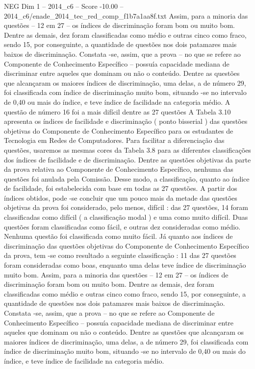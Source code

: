 \begin{textsample}{NEG Dim 1 – 2014\_c6 – Score -10.00 – 2014\_c6/enade\_2014\_tec\_red\_comp\_f1b7a1aa8f.txt}
Assim, para a minoria das questões – 12 em 27 – os índices de discriminação foram bom ou muito bom.
Dentre as demais, dez foram classificadas como médio e outras cinco como fraco, sendo 15, por conseguinte, a quantidade de questões nos dois patamares mais baixos de discriminação.
Constata -se, assim, que a prova – no que se refere ao Componente de Conhecimento Específico – possuía capacidade mediana de discriminar entre aqueles que dominam ou não o conteúdo.
Dentre as questões que alcançaram os maiores índices de discriminação, uma delas, a de número 29, foi classificada com índice de discriminação muito bom, situando -se no intervalo de 0,40 ou mais do índice, e teve índice de facilidade na categoria médio.
A questão de número 16 foi a mais difícil dentre as 27 questões A Tabela 3.10 apresenta os índices de facilidade e discriminação ( ponto bisserial ) das questões objetivas do Componente de Conhecimento Específico para os estudantes de Tecnologia em Redes de Computadores.
Para facilitar a diferenciação das questões, usaremos as mesmas cores da Tabela 3.8 para as diferentes classificações dos índices de facilidade e de discriminação.
Dentre as questões objetivas da parte da prova relativa ao Componente de Conhecimento Específico, nenhuma das questões foi anulada pela Comissão.
Desse modo, a classificação, quanto ao índice de facilidade, foi estabelecida com base em todas as 27 questões.
A partir dos índices obtidos, pode -se concluir que um pouco mais da metade das questões objetivas da prova foi considerado, pelo menos, difícil : das 27 questões, 14 foram classificadas como difícil ( a classificação modal ) e uma como muito difícil.
Duas questões foram classificadas como fácil, e outras dez consideradas como médio.
Nenhuma questão foi classificada como muito fácil.
Já quanto aos índices de discriminação das questões objetivas do Componente de Conhecimento Específico da prova, tem -se como resultado a seguinte classificação : 11 das 27 questões foram consideradas como boas, enquanto uma delas teve índice de discriminação muito bom.
Assim, para a minoria das questões – 12 em 27 – os índices de discriminação foram bom ou muito bom.
Dentre as demais, dez foram classificadas como médio e outras cinco como fraco, sendo 15, por conseguinte, a quantidade de questões nos dois patamares mais baixos de discriminação.
Constata -se, assim, que a prova – no que se refere ao Componente de Conhecimento Específico – possuía capacidade mediana de discriminar entre aqueles que dominam ou não o conteúdo.
Dentre as questões que alcançaram os maiores índices de discriminação, uma delas, a de número 29, foi classificada com índice de discriminação muito bom, situando -se no intervalo de 0,40 ou mais do índice, e teve índice de facilidade na categoria médio.

\end{textsample}
